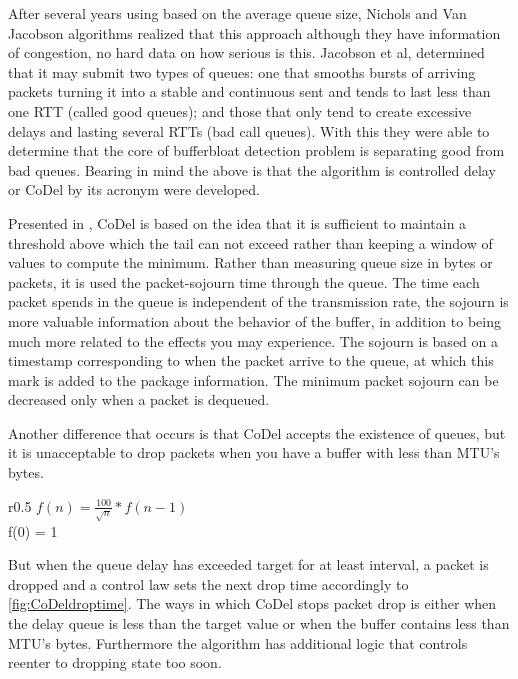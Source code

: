 After several years using based on the average queue size, Nichols and Van
Jacobson algorithms realized that this approach although they have information
of congestion, no hard data on how serious is this. Jacobson et al, determined
that it may submit two types of queues: one that smooths bursts of arriving
packets turning it into a stable and continuous sent and tends to last less
than one RTT (called good queues); and those that only tend to create
excessive delays and lasting several RTTs (bad call queues). With this they
were able to determine that the core of bufferbloat detection problem is
separating good from bad queues. Bearing in mind the above is that the
algorithm is controlled delay or CoDel by its acronym were developed.

Presented in \cite{NicholsJacobsonCQD}, CoDel is based on the idea that it is
sufficient to maintain a threshold above which the tail can not exceed rather
than keeping a window of values to compute the minimum. Rather than measuring
queue size in bytes or packets, it is used the packet-sojourn time through the
queue. The time each packet spends in the queue is independent of the
transmission rate, the sojourn is more valuable information about the behavior
of the buffer, in addition to being much more related to the effects you may
experience. The sojourn is based on a timestamp corresponding to when the
packet arrive to the queue, at which this mark is added to the package
information. The minimum packet sojourn can be decreased only when a packet is
dequeued.

Another difference that occurs is that CoDel accepts the existence of queues,
but it is unacceptable to drop packets when you have a buffer with less than
MTU's bytes.

\begin{wrapfigure}{r}{0.5\textwidth}
    \centering
	$f(n) = \frac{100}{\sqrt{n}}*f(n-1)$ \\
	f(0) = 1
    \caption[CoDel droptime interval]{CoDel droptime interval, n=iteration}
    \label{fig:CoDeldroptime}
\end{wrapfigure}

But when the queue delay has exceeded target for at least interval, a packet
is dropped and a control law sets the next drop time accordingly to
\ref{fig:CoDeldroptime}. The ways in which CoDel stops packet drop is either
when the delay queue is less than the target value or when the buffer contains
less than MTU's bytes. Furthermore the algorithm has additional logic that
controls reenter to dropping state too soon.


